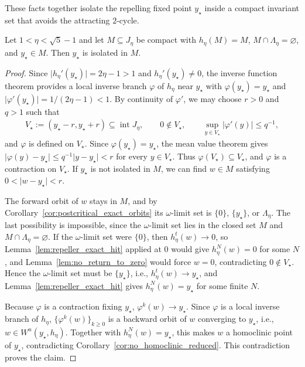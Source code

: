 \documentclass{article}
\begin{document}
These facts together isolate the repelling fixed point $y_\star$ inside a
compact invariant set that avoids the attracting $2$-cycle.

\begin{lemma}
\label{lem:ystar_isolated_invariant_set}
Let $1<\eta<\sqrt5-1$ and let $M\subseteq J_\eta$ be compact with
$h_\eta(M)=M$, $M\cap\Lambda_\eta=\varnothing$, and $y_\star\in M$. Then
$y_\star$ is isolated in $M$.
\end{lemma}

\begin{proof}
Since $\lvert h_\eta'(y_\star)\rvert=2\eta-1>1$ and
$h_\eta'(y_\star)\ne0$, the inverse function theorem provides a local inverse
branch $\varphi$ of $h_\eta$ near $y_\star$ with
$\varphi(y_\star)=y_\star$ and
$\lvert\varphi'(y_\star)\rvert=1/(2\eta-1)<1$. By continuity of $\varphi'$, we
may choose $r>0$ and $q>1$ such that
\begin{align}
    V_\star:=(y_\star-r,y_\star+r)\subseteq\operatorname{int}J_\eta,
    \qquad 0\notin V_\star,
    \qquad \sup_{y\in V_\star}\lvert\varphi'(y)\rvert\le q^{-1},
\end{align}
and $\varphi$ is defined on $V_\star$. Since $\varphi(y_\star)=y_\star$, the mean
value theorem gives
$\lvert\varphi(y)-y_\star\rvert\le q^{-1}\lvert y-y_\star\rvert<r$ for every
$y\in V_\star$. Thus $\varphi(V_\star)\subseteq V_\star$, and $\varphi$ is a
contraction on $V_\star$.
If $y_\star$ is not isolated in $M$, we can find $w\in M$ satisfying
$0<\lvert w-y_\star\rvert<r$.

The forward orbit of $w$ stays in $M$, and by
Corollary~\ref{cor:postcritical_exact_orbits} its $\omega$-limit set is
$\{0\}$, $\{y_\star\}$, or $\Lambda_\eta$. The last possibility is impossible,
since the $\omega$-limit set lies in the closed set $M$ and
$M\cap\Lambda_\eta=\varnothing$. If the $\omega$-limit set were $\{0\}$, then
$h_\eta^t(w)\to0$, so Lemma~\ref{lem:repeller_exact_hit} applied at $0$ would
give $h_\eta^N(w)=0$ for some $N$, and Lemma~\ref{lem:no_return_to_zero} would
force $w=0$, contradicting $0\notin V_\star$. Hence the
$\omega$-limit set must be $\{y_\star\}$, i.e., $h_\eta^t(w)\to y_\star$, and
Lemma~\ref{lem:repeller_exact_hit} gives $h_\eta^N(w)=y_\star$ for some finite
$N$.

Because $\varphi$ is a contraction fixing $y_\star$,
$\varphi^k(w)\to y_\star$.
Since $\varphi$ is a local inverse branch of $h_\eta$,
$\{\varphi^k(w)\}_{k\ge0}$ is a backward orbit of $w$ converging to $y_\star$,
i.e., $w\in W^u(y_\star,h_\eta)$.
Together with $h_\eta^N(w)=y_\star$, this makes $w$ a homoclinic point of
$y_\star$, contradicting Corollary~\ref{cor:no_homoclinic_reduced}. This
contradiction proves the claim.
\end{proof}
\end{document}
